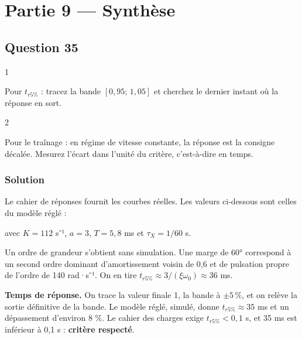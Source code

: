 \documentclass[11pt,a4paper]{article}
\newcommand{\equationajustee}[1]{%
  \sbox{\boiteequation}{$\displaystyle #1$}%
  \ifdim\wd\boiteequation>\linewidth
    \[\resizebox{\linewidth}{!}{\usebox{\boiteequation}}\]%
  \else
    \[#1\]%
  \fi}
\begin{document}
\hypertarget{partie-9-synthuxe8se}{%
\section{Partie 9 --- Synthèse}\label{partie-9-synthuxe8se}}

\hypertarget{question-35}{%
\subsection{Question 35}\label{question-35}}

\begin{indication}{1}

Pour \(t_{r5\%}\) : tracez la bande \([0{,}95;\,1{,}05]\) et cherchez le dernier instant où la réponse en sort.

\end{indication}

\begin{indication}{2}

Pour le traînage : en régime de vitesse constante, la réponse est la consigne décalée. Mesurez l'écart dans l'unité du critère, c'est-à-dire en temps.

\end{indication}

\hypertarget{solution-34}{%
\subsubsection{Solution}\label{solution-34}}

Le cahier de réponses fournit les courbes réelles. Les valeurs ci-dessous sont celles du modèle réglé :

\equationajustee{\text{FTBO} = K\frac{1+aTp}{1+Tp}\cdot\frac{1}{p(1+\tau_Xp)}}

avec \(K = 112\) s⁻¹, \(a = 3\), \(T = 5{,}8\) ms et \(\tau_X = 1/60\) s.

Un ordre de grandeur s'obtient sans simulation. Une marge de 60° correspond à un second ordre dominant d'amortissement voisin de 0,6 et de pulsation propre de l'ordre de 140 rad·s⁻¹. On en tire \(t_{r5\%}\approx 3/(\xi\omega_0)\approx 36\) ms.

\textbf{Temps de réponse.} On trace la valeur finale 1, la bande à \(\pm5\,\%\), et on relève la sortie définitive de la bande. Le modèle réglé, simulé, donne \(t_{r5\%}\approx35\) ms et un dépassement d'environ 8 \%. Le cahier des charges exige \(t_{r5\%} < 0{,}1\) s, et 35 ms est inférieur à 0,1 s : \textbf{critère respecté}.
\end{document}
